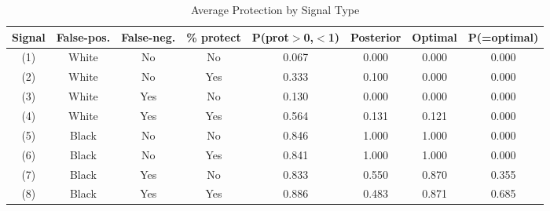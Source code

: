 \begin{table}[H]\centering \footnotesize \caption{Average Protection by Signal Type} \begin{tabular}{cccccccc} \hline \hline
\textbf{Signal}&\textbf{False-pos.}&\textbf{False-neg.}&\textbf{\% protect}& \textbf{P(prot$>$0,$<$1)}& \textbf{Posterior} & \textbf{Optimal} & \textbf{P(=optimal)} \\ \hline
(1)&White&No&No&0.067&0.000&0.000&0.000\\
(2)&White&No&Yes&0.333&0.100&0.000&0.000\\
(3)&White&Yes&No&0.130&0.000&0.000&0.000\\
(4)&White&Yes&Yes&0.564&0.131&0.121&0.000\\
(5)&Black&No&No&0.846&1.000&1.000&0.000\\
(6)&Black&No&Yes&0.841&1.000&1.000&0.000\\
(7)&Black&Yes&No&0.833&0.550&0.870&0.355\\
(8)&Black&Yes&Yes&0.886&0.483&0.871&0.685\\
\hline \end{tabular} \end{table}
